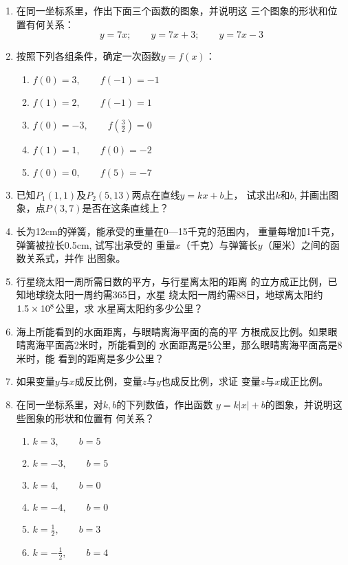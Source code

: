 \begin{enumerate}
\item 在同一坐标系里，作出下面三个函数的图象，并说明这
三个图象的形状和位置有何关系：
\[y=7x;\qquad y=7x+3;\qquad y=7x-3\]
\item 
按照下列各组条件，确定一次函数$y=f(x)$：
\begin{multicols}{2}
\begin{enumerate}
    \item $f(0)=3,\qquad f(-1)=-1$
    \item $f(1)=2,\qquad f(-1)=1$
    \item $f(0)=-3,\qquad f\left(\frac{3}{2}\right)=0$
    \item $f(1)=1,\qquad f(0)=-2$
    \item $f(0)=0,\qquad f(5)=-7$
\end{enumerate}
\end{multicols}
\item 已知$P_1(1,1)$及$P_2(5,13)$两点在直线$y=kx+b$上，
试求出$k$和$b$, 并画出图象，点$P(3,7)$是否在这条直线上？
\item 长为12cm的弹簧，能承受的重量在0—15千克的范围内，
重量每增加1千克，弹簧被拉长0.5cm, 试写出承受的
重量$x$（千克）与弹簧长$y$（厘米）之间的函数关系式，并作
出图象。
\item 
行星绕太阳一周所需日数的平方，与行星离太阳的距离
的立方成正比例，已知地球绕太阳一周约需365日，水星
绕太阳一周约需88日，地球离太阳约$1.5\times10^8$公里，求
水星离太阳约多少公里？
\item 海上所能看到的水面距离，与眼晴离海平面的高的平
方根成反比例。如果眼晴离海平面高2米时，所能看到的
水面距离是5公里，那么眼晴离海平面高是8米时，能
看到的距离是多少公里？
\item 如果变量$y$与$x$成反比例，变量$z$与$y$也成反比例，求证
变量$z$与$x$成正比例。
\item 在同一坐标系里，对$k,b$的下列数值，作出函数
$y=k|x|+b$的图象，并说明这些图象的形状和位置有
何关系？
\begin{multicols}{2}
\begin{enumerate}
    \item $k=3,\qquad b=5$
    \item $k=-3,\qquad b=5$
    \item $k=4,\qquad b=0$
    \item $k=-4,\qquad b=0$
    \item $k=\frac{1}{2},\qquad b=3$
    \item $k=-\frac{1}{2},\qquad b=4$
\end{enumerate}
\end{multicols}

\end{enumerate}

